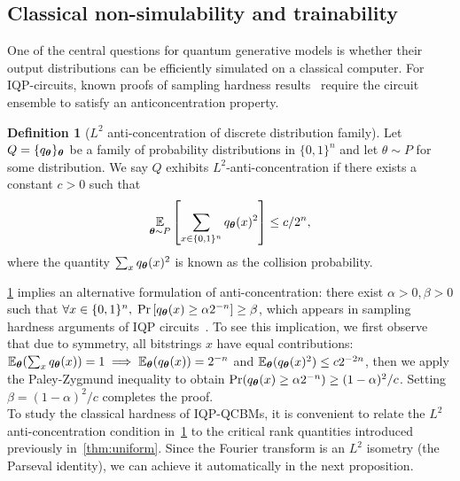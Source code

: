 \documentclass{article}
\theoremstyle{plain}
\theoremstyle{definition}
\newtheorem{definition}[theorem]{Definition}
\theoremstyle{remark}
\begin{document}
\subsection{Classical non-simulability and trainability}\label{subsec:non-simulability}
One of the central questions for quantum generative models is whether their output distributions can be efficiently simulated on a classical computer. For IQP-circuits, known proofs of sampling hardness results~\cite{Bremner17} require the circuit ensemble to satisfy an anticoncentration property.
\begin{definition}[$L^2$ anti-concentration of discrete distribution family]
\label{def:anti-concentration}
Let $Q = \{q_{\bm{\theta}}\}_{\bm{\theta}}$ be a family of probability distributions in $\{0,1\}^n$ and let $\theta \sim P$ for some distribution. We say $Q$ exhibits $L^2$-anti-concentration if there exists a constant $c>0$ such that 
\begin{equation}
    \operatorname*{\mathbb{E}}_{{\bm{\theta}} \sim P}\left[\sum_{x\in\{0,1\}^n} q_{\bm{\theta}}(x)^2\right] \leq c/2^n,
\end{equation}
where the quantity $\sum_x q_{\bm{\theta}}(x)^2$ is known as the collision probability.  
\end{definition}
\cref{def:anti-concentration} implies an alternative formulation of anti-concentration: there exist $\alpha>0,\beta>0$ such that $\forall x\in \{0,1\}^n, \;\Pr\left[q_{\bm{\theta}}(x)\geq \alpha 2^{-n}\right]\ge \beta$,
which appears in sampling hardness arguments of IQP circuits~\cite{Bremner16, Bremner17}. To see this implication, we first observe that due to symmetry, all bitstrings $x$ have equal contributions: $\mathbb{E}_{\bm{\theta}}(\sum_xq_{\bm{\theta}}(x)) = 1\implies \mathbb{E}_{\bm{\theta}}(q_{\bm{\theta}}(x)) = 2^{-n}$ and $\mathbb{E}_{\bm{\theta}}(q_{\bm{\theta}}(x)^2) \le c2^{-2n}$, then we apply the Paley-Zygmund inequality to obtain $\Pr(q_{\bm{\theta}}(x) \ge \alpha2^{-n}) \ge (1-\alpha)^2/c$. Setting $\beta = (1-\alpha)^2/c$ completes the proof.\\
To study the classical hardness of IQP-QCBMs, it is convenient to relate the $L^2$ anti-concentration condition in~\cref{def:anti-concentration} to the critical rank quantities introduced previously  in~\cref{thm:uniform}. Since the Fourier transform is an $L^2$ isometry (the Parseval identity), we can achieve it automatically in the next proposition.
\end{document}
